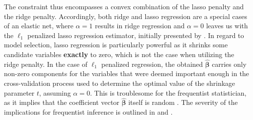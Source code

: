 \documentclass[a4paper,12pt, headsepline]{scrartcl}
\numberwithin{equation}{section}
\begin{document}
The constraint thus encompasses a convex combination of the lasso penalty and the ridge penalty. Accordingly, both ridge and lasso regression are a special cases of an elastic net, where $\alpha = 1$ results in ridge regression and $\alpha = 0$ leaves us with the $\ell_1$ penalized lasso regression estimator, initially presented by \citet{tibshirani96}. In regard to model selection, lasso regression is particularly powerful as it shrinks some candidate variables \textbf{exactly} to zero, which is not the case when utilizing the ridge penalty. In the case of $\ell_1$ penalized regression, the obtained $\bm{\hat{\beta}}$ carries only non-zero components for the variables that were deemed important enough in the cross-validation process used to determine the optimal value of the shrinkage parameter $t$, assuming $\alpha = 0$. This is troublesome for the frequentist statistician, as it implies that the coefficient vector $\bm{\hat{\beta}}$ itself is random \citep{Lee2016}. The severity of the implications for frequentist inference is outlined in \citet{benjamini05} and \citet{benjamini09}.
\end{document}
